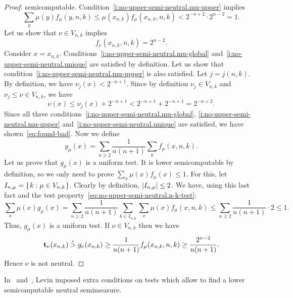 \begin{proof}
semicomputable.
Condition~\eqref{i:no-upper-semi-neutral.mu-upper} implies
 \begin{equation}\label{eq:no-upper-semi-neutral.n-k-test}
 \sum_{y} \mu(y) f_{\mu}(y,n,k) \le
    \mu(x_{n,k})f_{\mu}(x_{n,k},n,k) < 2^{-n+2}\cdot 2^{n-2} = 1.
 \end{equation}
Let us show that \( \nu \in V_{n,k} \) implies
 \begin{equation}\label{eq:found-bad}
 f_{\nu}(x_{n,k},n,k) = 2^{n-2}.
 \end{equation}
Consider \( x=x_{n,k} \).
Conditions~\eqref{i:no-upper-semi-neutral.mu-global} 
and~\eqref{i:no-upper-semi-neutral.unique} are satisfied by definition.
Let us show that condition~\eqref{i:no-upper-semi-neutral.mu-upper} is also 
satisfied.
Let \( j=j(n,k) \).
By definition, we have \( \nu_{j}(x) < 2^{-n+1} \).
Since by definition \( \nu_{j}\in V_{n,k} \) and \( \nu_{j} \le \nu \in V_{n,k} \),
we have 
 \[
  \nu(x) \le \nu_{j}(x) + 2^{-n+1} < 2^{-n+1} + 2^{-n+1} = 2^{-n+2}.
 \]
Since all three conditions~\eqref{i:no-upper-semi-neutral.mu-global},
\eqref{i:no-upper-semi-neutral.mu-upper}
and~\eqref{i:no-upper-semi-neutral.unique} are satisfied, we have 
shown~\eqref{eq:found-bad}.
Now we define
 \[
   g_{\mu}(x) = \sum_{n\ge 2}\frac{1}{n(n+1)}\sum_{k}f_{\mu}(x,n,k).
 \]
Let us prove that \( g_{\mu}(x) \) is a uniform test.
It is lower semicomputable by definition, so we only need to prove
\( \sum_{x} \mu(x) f_{\mu}(x) \le 1 \).
For this, let \( I_{n,\mu} = \mathopen\{\mskip 1mu k: \mu\in V_{n,k}\mskip 1mu\mathclose\} \).
Clearly by definition, \( |I_{n,\mu}|\le 2 \).
We have, using this last fact and the test 
property~\eqref{eq:no-upper-semi-neutral.n-k-test}:
 \[
  \sum_{x} \mu(x) g_{\mu}(x) = 
  \sum_{n\ge 2}\frac{1}{n(n+1)}
  \sum_{k\in I_{n,\mu}} \sum_{x}\mu(x) f_{\mu}(x,n,k)
       \le  \sum_{n\ge 2}\frac{1}{n(n+1)}\cdot 2 \le 1.
 \]
Thus, \( g_{\mu}(x) \) is a uniform test.
If \( \nu\in V_{n,k} \) then we have
 \[
 \mathbf{t}_{\nu}(x_{n,k}) 
\stackrel{{}_*}{>} g_{\nu}(x_{n,k}) \ge \frac{1}{n(n+1)}f_{\mu}(x_{n,k},n,k) \ge 
  \frac{2^{n-2}}{n(n+1)}.
 \]
Hence \( \nu \) is not neutral.
 \end{proof}

 \begin{remark}
  \label{rem:g4.3.5}
In~\cite{LevinUnif76} and~\cite{LevinRandCons84},
Levin imposed extra conditions on tests which allow to find a lower
semicomputable neutral semimeasure.
 \end{remark}

